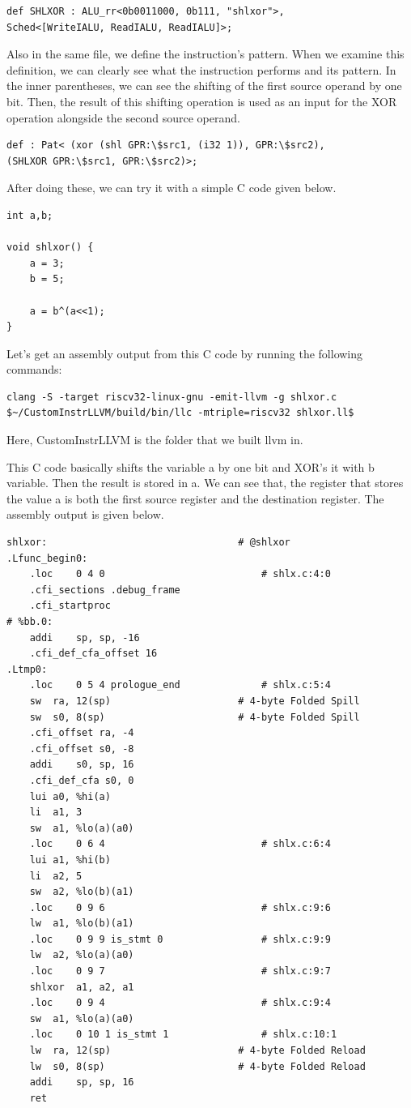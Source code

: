 \begin{lstlisting}
def SHLXOR : ALU_rr<0b0011000, 0b111, "shlxor">,
Sched<[WriteIALU, ReadIALU, ReadIALU]>;
\end{lstlisting}

Also in the same file, we define the instruction’s pattern. When we examine this definition, we can clearly see what the instruction performs and its pattern. In the inner parentheses, we can see the shifting of the first source operand by one bit. Then, the result of this shifting operation is used as an input for the XOR operation alongside the second source operand.

\begin{lstlisting}
def : Pat< (xor (shl GPR:\$src1, (i32 1)), GPR:\$src2),
(SHLXOR GPR:\$src1, GPR:\$src2)>;
\end{lstlisting}

After doing these, we can try it with a simple C code given below. 

\begin{lstlisting}
int a,b;

void shlxor() {
	a = 3;
	b = 5;
		
	a = b^(a<<1);
}
\end{lstlisting}

Let’s get an assembly output from this C code by running the following commands:

\begin{lstlisting}
clang -S -target riscv32-linux-gnu -emit-llvm -g shlxor.c
$~/CustomInstrLLVM/build/bin/llc -mtriple=riscv32 shlxor.ll$
\end{lstlisting}

Here, CustomInstrLLVM is the folder that we built llvm in.

This C code basically shifts the variable a by one bit and XOR’s it with b variable. Then the result is stored in a. We can see that, the register that stores the value a is both the first source register and the destination register. The assembly output is given below.

\begin{lstlisting}
shlxor:                                 # @shlxor
.Lfunc_begin0:
	.loc	0 4 0                           # shlx.c:4:0
	.cfi_sections .debug_frame
	.cfi_startproc
# %bb.0:
	addi	sp, sp, -16
	.cfi_def_cfa_offset 16
.Ltmp0:
	.loc	0 5 4 prologue_end              # shlx.c:5:4
	sw	ra, 12(sp)                      # 4-byte Folded Spill
	sw	s0, 8(sp)                       # 4-byte Folded Spill
	.cfi_offset ra, -4
	.cfi_offset s0, -8
	addi	s0, sp, 16
	.cfi_def_cfa s0, 0
	lui	a0, %hi(a)
	li	a1, 3
	sw	a1, %lo(a)(a0)
	.loc	0 6 4                           # shlx.c:6:4
	lui	a1, %hi(b)
	li	a2, 5
	sw	a2, %lo(b)(a1)
	.loc	0 9 6                           # shlx.c:9:6
	lw	a1, %lo(b)(a1)
	.loc	0 9 9 is_stmt 0                 # shlx.c:9:9
	lw	a2, %lo(a)(a0)
	.loc	0 9 7                           # shlx.c:9:7
	shlxor	a1, a2, a1
	.loc	0 9 4                           # shlx.c:9:4
	sw	a1, %lo(a)(a0)
	.loc	0 10 1 is_stmt 1                # shlx.c:10:1
	lw	ra, 12(sp)                      # 4-byte Folded Reload
	lw	s0, 8(sp)                       # 4-byte Folded Reload
	addi	sp, sp, 16
	ret
\end{lstlisting}

